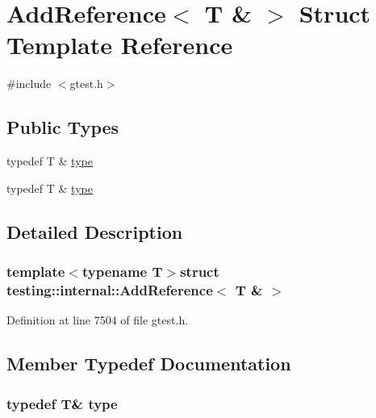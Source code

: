 \hypertarget{structtesting_1_1internal_1_1AddReference_3_01T_01_6_01_4}{\section{\-Add\-Reference$<$ \-T \& $>$ \-Struct \-Template \-Reference}
\label{dc/d2d/structtesting_1_1internal_1_1AddReference_3_01T_01_6_01_4}
}


{\ttfamily \#include $<$gtest.\-h$>$}

\subsection*{\-Public \-Types}
\begin{DoxyCompactItemize}
\item 
typedef \-T \& \hyperlink{structtesting_1_1internal_1_1AddReference_3_01T_01_6_01_4_a08e05528fbb401bd8299a21d67d13ee3}{type}
\item 
typedef \-T \& \hyperlink{structtesting_1_1internal_1_1AddReference_3_01T_01_6_01_4_a08e05528fbb401bd8299a21d67d13ee3}{type}
\end{DoxyCompactItemize}


\subsection{\-Detailed \-Description}
\subsubsection*{template$<$typename T$>$struct testing\-::internal\-::\-Add\-Reference$<$ T \& $>$}



\-Definition at line 7504 of file gtest.\-h.



\subsection{\-Member \-Typedef \-Documentation}
\hypertarget{structtesting_1_1internal_1_1AddReference_3_01T_01_6_01_4_a08e05528fbb401bd8299a21d67d13ee3}{
\subsubsection[{type}]{\setlength{\rightskip}{0pt plus 5cm}typedef \-T\& {\bf type}}}\label{dc/d2d/structtesting_1_1internal_1_1AddReference_3_01T_01_6_01_4_a08e05528fbb401bd8299a21d67d13ee3}


